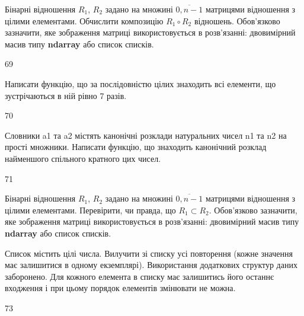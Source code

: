 Бінарні відношення $R_1$, $R_2$ задано на множині $\overline{0,n-1}$ матрицями відношення з цілими елементами. Обчислити композицію $R_1\circ R_2$ відношень. Обов'язково зазначити, яке зображення матриці використовується в розв'язанні: двовимірний масив типу \textbf{ndarray} або список списків.
\\\par
69 














Написати функцію, що за послідовністю цілих знаходить всі елементи, що зустрічаються в ній рівно 7 разів.
\\\par
70 














Словники a1 та a2 містять канонічні розклади натуральних чисел n1 та n2 на прості множники. Написати функцію, що знаходить канонічний розклад найменшого спільного кратного цих чисел.
\\\par
71 














Бінарні відношення $R_1$, $R_2$ задано на множині $\overline{0,n-1}$ матрицями відношення з цілими елементами. Перевірити, чи правда, що $R_1\subset R_2$. Обов'язково зазначити, яке зображення матриці використовується в розв'язанні: двовимірний масив типу \textbf{ndarray} або список списків.
\\\par
{} 














Список містить цілі числа. Вилучити зі списку усі повторення (кожне значення має залишитися в одному екземплярі). Використання додаткових структур даних заборонено. Для кожного елемента в списку має залишитись його останнє входження і при цьому порядок елементів змінювати не можна.
\\\par
73 














